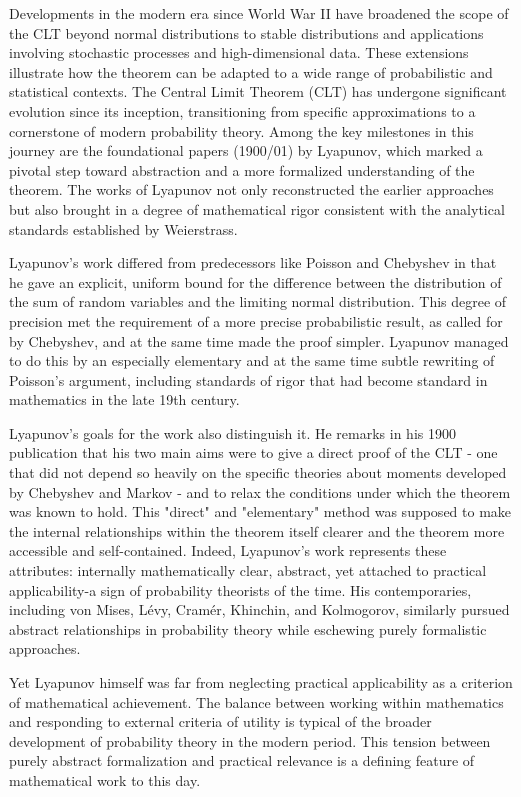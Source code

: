 Developments in the modern era since World War II have broadened the scope of the CLT beyond normal distributions to stable distributions and applications involving stochastic processes and high-dimensional data. These extensions illustrate how the theorem can be adapted to a wide range of probabilistic and statistical contexts.
The Central Limit Theorem (CLT) has undergone significant evolution since its inception, transitioning from specific approximations to a cornerstone of modern probability theory. Among the key milestones in this journey are the foundational papers (1900/01) by Lyapunov, which marked a pivotal step toward abstraction and a more formalized understanding of the theorem. The works of Lyapunov not only reconstructed the earlier approaches but also brought in a degree of mathematical rigor consistent with the analytical standards established by Weierstrass.

Lyapunov's work differed from predecessors like Poisson and Chebyshev in that he gave an explicit, uniform bound for the difference between the distribution of the sum of random variables and the limiting normal distribution. This degree of precision met the requirement of a more precise probabilistic result, as called for by Chebyshev, and at the same time made the proof simpler. Lyapunov managed to do this by an especially elementary and at the same time subtle rewriting of Poisson's argument, including standards of rigor that had become standard in mathematics in the late 19th century.

Lyapunov's goals for the work also distinguish it. He remarks in his 1900 publication that his two main aims were to give a direct proof of the CLT - one that did not depend so heavily on the specific theories about moments developed by Chebyshev and Markov - and to relax the conditions under which the theorem was known to hold. This "direct" and "elementary" method was supposed to make the internal relationships within the theorem itself clearer and the theorem more accessible and self-contained. Indeed, Lyapunov's work represents these attributes: internally mathematically clear, abstract, yet attached to practical applicability-a sign of probability theorists of the time. His contemporaries, including von Mises, Lévy, Cramér, Khinchin, and Kolmogorov, similarly pursued abstract relationships in probability theory while eschewing purely formalistic approaches.

Yet Lyapunov himself was far from neglecting practical applicability as a criterion of mathematical achievement. The balance between working within mathematics and responding to external criteria of utility is typical of the broader development of probability theory in the modern period. This tension between purely abstract formalization and practical relevance is a defining feature of mathematical work to this day.

